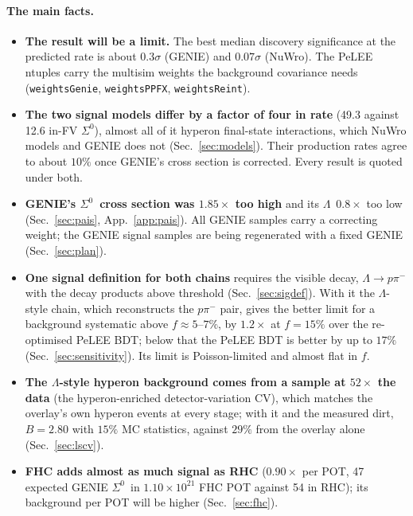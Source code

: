 \documentclass[11pt,a4paper]{article}
\newcommand{\Szero}{\ensuremath{\Sigma^{0}}}
\newcommand{\Lam}{\ensuremath{\Lambda}}
\begin{document}
\paragraph{The main facts.}
\begin{itemize}
  \item \textbf{The result will be a limit.} The best median discovery significance at
        the predicted rate is about $0.3\sigma$ (GENIE) and $0.07\sigma$ (NuWro). The PeLEE
        ntuples carry the multisim weights the background covariance needs
        (\texttt{weightsGenie}, \texttt{weightsPPFX}, \texttt{weightsReint}).
  \item \textbf{The two signal models differ by a factor of four in rate} (49.3 against
        12.6 in-FV \Szero), almost all of it hyperon final-state interactions, which
        NuWro models and GENIE does not (Sec.~\ref{sec:models}). Their production rates
        agree to about $10\%$ once GENIE's cross section is corrected. Every result is
        quoted under both.
  \item \textbf{GENIE's \Szero\ cross section was $1.85\times$ too high} and its \Lam\
        $0.8\times$ too low (Sec.~\ref{sec:pais}, App.~\ref{app:pais}). All GENIE samples
        carry a correcting weight; the GENIE signal samples are being regenerated with a
        fixed GENIE (Sec.~\ref{sec:plan}).
  \item \textbf{One signal definition for both chains} requires the visible decay,
        $\Lam\to p\pi^-$ with the decay products above threshold (Sec.~\ref{sec:sigdef}).
        With it the \Lam-style chain, which reconstructs the $p\pi^-$ pair, gives the better
        limit for a background systematic above $f\approx5$--$7\%$, by $1.2\times$ at $f=15\%$
        over the re-optimised PeLEE BDT; below that the PeLEE BDT is better by up to $17\%$
        (Sec.~\ref{sec:sensitivity}). Its limit is Poisson-limited and almost flat in $f$.
  \item \textbf{The \Lam-style hyperon background comes from a sample at $52\times$ the data}
        (the hyperon-enriched detector-variation CV), which matches the overlay's own hyperon
        events at every stage; with it and the measured dirt, $B=2.80$ with $15\%$ MC
        statistics, against $29\%$ from the overlay alone (Sec.~\ref{sec:lscv}).
  \item \textbf{FHC adds almost as much signal as RHC} ($0.90\times$ per POT, 47
        expected GENIE \Szero\ in $1.10\times10^{21}$ FHC POT against 54 in RHC); its
        background per POT will be higher (Sec.~\ref{sec:fhc}).
\end{itemize}
\end{document}

